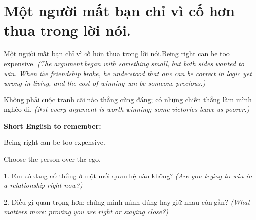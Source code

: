 \section{Một người mất bạn chỉ vì cố hơn thua trong lời nói.}
\begin{truyen}{Một người mất bạn chỉ vì cố hơn thua trong lời nói.}{Being right can be too expensive.}
\textit{(The argument began with something small, but both sides wanted to win. When the friendship broke, he understood that one can be correct in logic yet wrong in living, and the cost of winning can be someone precious.)}
\end{truyen}
\begin{baihoc}
Không phải cuộc tranh cãi nào thắng cũng đáng; có những chiến thắng làm mình nghèo đi.
\textit{(Not every argument is worth winning; some victories leave us poorer.)}
\end{baihoc}
\begin{ghinhoanh}
\textbf{Short English to remember:}

Being right can be too expensive.

Choose the person over the ego.
\end{ghinhoanh}
\begin{tuhocnhanh}
1. Em có đang cố thắng ở một mối quan hệ nào không? \textit{(Are you trying to win in a relationship right now?)}

2. Điều gì quan trọng hơn: chứng minh mình đúng hay giữ nhau còn gần? \textit{(What matters more: proving you are right or staying close?)}
\end{tuhocnhanh}
\ngancach

